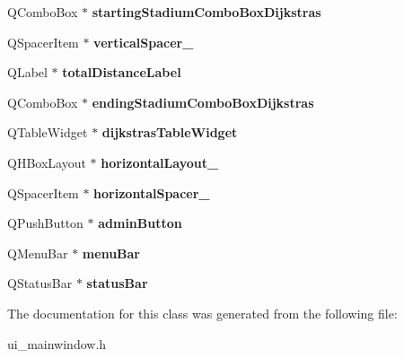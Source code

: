 \begin{DoxyCompactItemize}
Q\+Combo\+Box $\ast$ {\bfseries starting\+Stadium\+Combo\+Box\+Dijkstras}
\item 
\mbox{\label{class_ui___main_window_ac845bdf6b5b5237378a7b067808b7a31}} 
Q\+Spacer\+Item $\ast$ {\bfseries vertical\+Spacer\+\_}
\item 
\mbox{\label{class_ui___main_window_a3e42cf31133f6fb31d515d9b796b97c7}} 
Q\+Label $\ast$ {\bfseries total\+Distance\+Label}
\item 
\mbox{\label{class_ui___main_window_a1d094ac9c7dd9721830954c8f772aa88}} 
Q\+Combo\+Box $\ast$ {\bfseries ending\+Stadium\+Combo\+Box\+Dijkstras}
\item 
\mbox{\label{class_ui___main_window_a903d613fd69c321aa4d62393b1d6b2a5}} 
Q\+Table\+Widget $\ast$ {\bfseries dijkstras\+Table\+Widget}
\item 
\mbox{\label{class_ui___main_window_a80867018070156432923d0266cc9fe25}} 
Q\+H\+Box\+Layout $\ast$ {\bfseries horizontal\+Layout\+\_}
\item 
\mbox{\label{class_ui___main_window_a100e0ffd031f76754eba5078288deabf}} 
Q\+Spacer\+Item $\ast$ {\bfseries horizontal\+Spacer\+\_}
\item 
\mbox{\label{class_ui___main_window_a925ce7e6309f6d33ffea69ca078aa72b}} 
Q\+Push\+Button $\ast$ {\bfseries admin\+Button}
\item 
\mbox{\label{class_ui___main_window_a2be1c24ec9adfca18e1dcc951931457f}} 
Q\+Menu\+Bar $\ast$ {\bfseries menu\+Bar}
\item 
\mbox{\label{class_ui___main_window_a50fa481337604bcc8bf68de18ab16ecd}} 
Q\+Status\+Bar $\ast$ {\bfseries status\+Bar}
\end{DoxyCompactItemize}


The documentation for this class was generated from the following file\+:\begin{DoxyCompactItemize}
\item 
ui\+\_\+mainwindow.\+h\end{DoxyCompactItemize}
